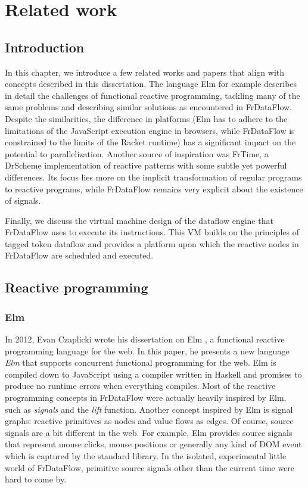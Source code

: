 \chapter{Related work}

\section{Introduction}

In this chapter, we introduce a few related works and papers that align with concepts described in this dissertation. The language Elm for example describes in detail the challenges of functional reactive programming, tackling many of the same problems and describing similar solutions as encountered in FrDataFlow. Despite the similarities, the difference in platforms (Elm has to adhere to the limitations of the JavaScript execution engine in browsers, while FrDataFlow is constrained to the limits of the Racket runtime) has a significant impact on the potential to parallelization. Another source of inspiration was FrTime, a DrScheme implementation of reactive patterns with some subtle yet powerful differences. Its focus lies more on the implicit transformation of regular programs to reactive programs, while FrDataFlow remains very explicit about the existence of signals.

Finally, we discuss the virtual machine design of the dataflow engine that FrDataFlow uses to execute its instructions. This VM builds on the principles of tagged token dataflow and provides a platform upon which the reactive nodes in FrDataFlow are scheduled and executed. 

\section{Reactive programming}

\subsection{Elm}

In 2012, Evan Czaplicki wrote his dissertation on Elm \cite{czaplicki_elm:_2012}, a functional reactive programming language for the web. In this paper, he presents a new language \textit{Elm} that supports concurrent functional programming for the web. Elm is compiled down to JavaScript using a compiler written in Haskell and promises to produce no runtime errors when everything compiles. 
Most of the reactive programming concepts in FrDataFlow were actually heavily inspired by Elm, such as \textit{signals} and the \textit{lift} function. 
Another concept inspired by Elm is signal graphs: reactive primitives as nodes and value flows as edges. Of course, source signals are a bit different in the web. For example, Elm provides source signals that represent mouse clicks, mouse positions or generally any kind of DOM event which is captured by the standard library. In the isolated, experimental little world of FrDataFlow, primitive source signals other than the current time were hard to come by. 

